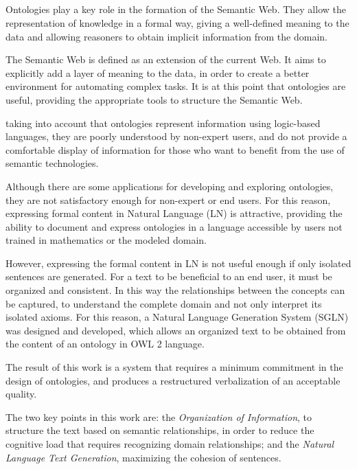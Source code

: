 \ \\
\ \\
\label{pagsumm}
\\ \\
Ontologies play a key role in the formation of the Semantic Web. They allow the representation of knowledge in a formal way, giving a well-defined meaning to the data and allowing reasoners to obtain implicit information from the domain.

The Semantic Web is defined as an extension of the current Web. It aims to explicitly add a layer of meaning to the data, in order to create a better environment for automating complex tasks. It is at this point that ontologies are useful, providing the appropriate tools to structure the Semantic Web.

taking into account that ontologies represent information using logic-based languages, they are poorly understood by non-expert users, and do not provide a comfortable display of information for those who want to benefit from the use of semantic technologies.

Although there are some applications for developing and exploring ontologies, they are not satisfactory enough for non-expert or end users.
For this reason, expressing formal content in Natural Language (LN) is attractive, providing the ability to document and express ontologies in a language accessible by users not trained in mathematics or the modeled domain.


However, expressing the formal content in LN is not useful enough if only isolated sentences are generated. For a text to be beneficial to an end user, it must be organized and consistent. In this way the relationships between the concepts can be captured, to understand the complete domain and not only interpret its isolated axioms. For this reason, a Natural Language Generation System (SGLN) was designed and developed, which allows an organized text to be obtained from the content of an ontology in OWL 2 language.


The result of this work is a system that requires a minimum commitment in the design of ontologies, and produces a restructured verbalization of an acceptable quality.

The two key points in this work are: the \textit{Organization of Information}, to structure the text based on semantic relationships, in order to reduce the cognitive load that requires recognizing domain relationships; and the \textit{Natural Language Text Generation}, maximizing the cohesion of sentences.


\vfill
\pagebreak
